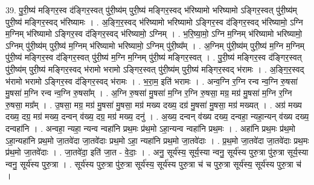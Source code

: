 \documentclass[17pt]{extarticle}
\begin{document}
39. पु॒री॒ष्य॑ मङ्गिर॒स्व द॑ङ्गिर॒स्वत् पु॑री॒ष्य॑म् पुरी॒ष्य॑ मङ्गिर॒स्वद् भ॑रिष्यामो भरिष्यामो ऽङ्गिर॒स्वत् पु॑री॒ष्य॑म् पुरी॒ष्य॑ मङ्गिर॒स्वद् भ॑रिष्यामः । . अ॒ङ्गि॒र॒स्वद् भ॑रिष्यामो भरिष्यामो ऽङ्गिर॒स्व द॑ङ्गिर॒स्वद् भ॑रिष्यामो॒ ऽग्नि म॒ग्निम् भ॑रिष्यामो ऽङ्गिर॒स्व द॑ङ्गिर॒स्वद् भ॑रिष्यामो॒ ऽग्निम् । . भ॒रि॒ष्या॒मो॒ ऽग्नि म॒ग्निम् भ॑रिष्यामो भरिष्यामो॒ ऽग्निम् पु॑री॒ष्य॑म् पुरी॒ष्य॑ म॒ग्निम् भ॑रिष्यामो भरिष्यामो॒ ऽग्निम् पु॑री॒ष्य᳚म् । . अ॒ग्निम् पु॑री॒ष्य॑म् पुरी॒ष्य॑ म॒ग्नि म॒ग्निम् पु॑री॒ष्य॑ मङ्गिर॒स्व द॑ङ्गिर॒स्वत् पु॑री॒ष्य॑ म॒ग्नि म॒ग्निम् पु॑री॒ष्य॑ मङ्गिर॒स्वत् । . पु॒री॒ष्य॑ मङ्गिर॒स्व द॑ङ्गिर॒स्वत् पु॑री॒ष्य॑म् पुरी॒ष्य॑ मङ्गिर॒स्वद् भ॑रामो भरामो ऽङ्गिर॒स्वत् पु॑री॒ष्य॑म् पुरी॒ष्य॑ मङ्गिर॒स्वद् भ॑रामः । . अ॒ङ्गि॒र॒स्वद् भ॑रामो भरामो ऽङ्गिर॒स्व द॑ङ्गिर॒स्वद् भ॑रामः । . भ॒रा॒म॒ इति॑ भरामः । . अन्व॒ग्नि र॒ग्नि रन्व न्व॒ग्नि रु॒षसा॑ मु॒षसा॑ म॒ग्नि रन्व न्व॒ग्नि रु॒षसा᳚म् । . अ॒ग्नि रु॒षसा॑ मु॒षसा॑ म॒ग्नि र॒ग्नि रु॒षसा॒ मग्र॒ मग्र॑ मु॒षसा॑ म॒ग्नि र॒ग्नि रु॒षसा॒ मग्र᳚म् । . उ॒षसा॒ मग्र॒ मग्र॑ मु॒षसा॑ मु॒षसा॒ मग्र॑ मख्य दख्य॒ दग्र॑ मु॒षसा॑ मु॒षसा॒ मग्र॑ मख्यत् । . अग्र॑ मख्य दख्य॒ दग्र॒ मग्र॑ मख्य॒ दन्वन् व॑ख्य॒ दग्र॒ मग्र॑ मख्य॒ दनु॑ । . अ॒ख्य॒ दन्वन् व॑ख्य दख्य॒ दन्वहा॒ न्यहा॒न्यन् व॑ख्य दख्य॒ दन्वहा॑नि । . अन्वहा॒ न्यहा॒ न्यन्व न्वहा॑नि प्रथ॒मः प्र॑थ॒मो ऽहा॒न्यन्व न्वहा॑नि प्रथ॒मः । . अहा॑नि प्रथ॒मः प्र॑थ॒मो ऽहा॒न्यहा॑नि प्रथ॒मो जा॒तवे॑दा जा॒तवे॑दाः प्रथ॒मो ऽहा॒ न्यहा॑नि प्रथ॒मो जा॒तवे॑दाः । . प्र॒थ॒मो जा॒तवे॑दा जा॒तवे॑दाः प्रथ॒मः प्र॑थ॒मो जा॒तवे॑दाः । . जा॒तवे॑दा॒ इति॑ जा॒त - वे॒दाः॒ । . अनु॒ सूर्य॑स्य॒ सूर्य॒स्या न्वनु॒ सूर्य॑स्य पुरु॒त्रा पु॑रु॒त्रा सूर्य॒स्या न्वनु॒ सूर्य॑स्य पुरु॒त्रा । . सूर्य॑स्य पुरु॒त्रा पु॑रु॒त्रा सूर्य॑स्य॒ सूर्य॑स्य पुरु॒त्रा च॑ च पुरु॒त्रा सूर्य॑स्य॒ सूर्य॑स्य पुरु॒त्रा च॑ । \newline
\pagebreak
{}
\end{document}
